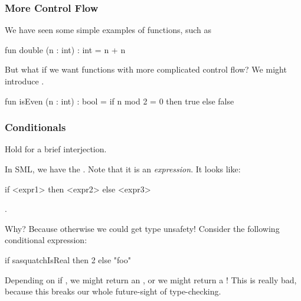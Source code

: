 \documentclass[aspectratio=169, handout]{beamer}
\begin{document}
\begin{frame}[fragile]
  \frametitle{More Control Flow}

  We have seen some simple examples of
  functions, such as
  \begin{codeblock}
    fun double (n : int) : int = n + n
  \end{codeblock}

  \pause
  \vspace{\fill}

  But what if we want functions with more complicated control flow? We might introduce
  .

  \begin{codeblock}
    fun isEven (n : int) : bool =
      if n mod 2 = 0 then true
      else false
  \end{codeblock}

  \pause
  \vspace{\fill}

\end{frame}

\begin{frame}[fragile]
  \frametitle{Conditionals}

  Hold for a brief interjection.

  \pause
  \vspace{\fill}

  In SML, we have the . Note that it is an \textit{expression}. It looks like:
  \begin{codeblock}
    if <expr1> then <expr2> else <expr3>
  \end{codeblock}

  \pause
  \vspace{\fill}

  .

  \pause
  \vspace{\fill}

  Why? Because otherwise we could get type unsafety! Consider the following conditional
  expression:
  \begin{codeblock}
    if sasquatchIsReal then 2 else "foo"
  \end{codeblock}

  \pause
  \vspace{\fill}

  Depending on if , we might return an , or we might return
  a ! This is really bad, because this breaks our whole future-sight of
  type-checking.
\end{frame}
\end{document}

